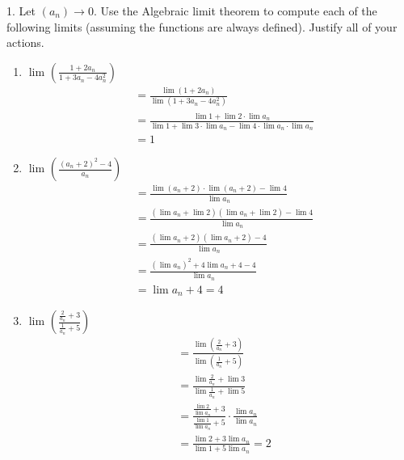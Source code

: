 
1. Let $\left( a_n \right) \to 0$. Use the Algebraic limit theorem to compute each of the following limits (assuming the functions are always defined). Justify all of your actions.

\begin{enumerate}
	\item $\lim_{} \left( \frac{1 + 2a_n}{1 + 3 a_n - 4 a_{n}^{2}} \right) $ 
	\begin{align}
		&= \frac{\lim_{} \left( 1 + 2 a_n \right)}{\lim_{} \left( 1 + 3 a_n - 4a_n^{2} \right)} \\
		&= \frac{\lim_{} 1 + \lim_{} 2 \cdot \lim_{} a_n}{\lim_{} 1 + \lim_{} 3 \cdot  \lim_{} a_n - \lim_{} 4 \cdot \lim_{} a_n \cdot \lim_{} a_n} \\
		&= 1
	\end{align}

	\item $\lim_{} \left( \frac{\left( a_n + 2 \right)^{2} - 4}{a_n} \right) $
		\begin{align}
			&= \frac{\lim_{} \left( a_n + 2 \right) \cdot \lim_{} \left( a_n + 2 \right) - \lim_{} 4}{\lim_{} a_n} \\
			&= \frac{\left( \lim_{} a_n + \lim_{} 2 \right) \left( \lim_{} a_n + \lim_{} 2 \right) - \lim_{} 4}{\lim_{} a_n} \\
			&= \frac{\left( \lim_{} a_n + 2 \right) \left( \lim_{} a_n + 2 \right) - 4}{\lim_{} a_n} \\
			&= \frac{\left( \lim_{} a_n \right)^{2} + 4 \lim_{} a_n + 4 - 4}{\lim_{} a_n} \\
			&= \lim_{} a_n + 4 = 4
		\end{align}

	\item $\lim_{} \left( \frac{\frac{2}{a_n} + 3}{\frac{1}{a_n} + 5} \right)$
		\begin{align}
			&= \frac{\lim_{} \left( \frac{2}{a_n} + 3 \right) }{\lim_{} \left( \frac{1}{a_n} + 5 \right)} \\
			&= \frac{\lim_{} \frac{2}{a_n} + \lim_{} 3}{\lim_{} \frac{1}{a_n} + \lim_{} 5} \\
			&= \frac{\frac{\lim_{} 2}{\lim_{} a_n} + 3}{\frac{\lim_{} 1}{\lim_{} a_n} + 5} \cdot \frac{\lim_{} a_n}{\lim_{} a_n} \\
			&= \frac{\lim_{} 2 + 3 \lim_{} a_n}{\lim_{} 1 + 5 \lim_{} a_n} = 2
		\end{align}
\end{enumerate}
